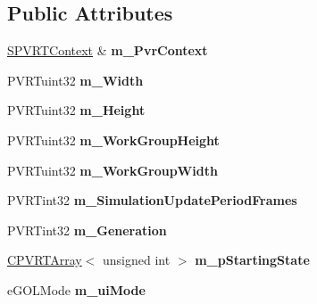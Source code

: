 \subsection*{Public Attributes}
\begin{DoxyCompactItemize}
\item 
\hypertarget{class_game_of_life_af81423a9dd79ec2f2dc280d46642a503}{\hyperlink{struct_s_p_v_r_t_context}{S\+P\+V\+R\+T\+Context} \& {\bfseries m\+\_\+\+Pvr\+Context}}\label{class_game_of_life_af81423a9dd79ec2f2dc280d46642a503}

\item 
\hypertarget{class_game_of_life_a3840077d5d30c9eba60ed7b21aeba0c9}{P\+V\+R\+Tuint32 {\bfseries m\+\_\+\+Width}}\label{class_game_of_life_a3840077d5d30c9eba60ed7b21aeba0c9}

\item 
\hypertarget{class_game_of_life_ad0f876f73910c5c841fe87a4b9963232}{P\+V\+R\+Tuint32 {\bfseries m\+\_\+\+Height}}\label{class_game_of_life_ad0f876f73910c5c841fe87a4b9963232}

\item 
\hypertarget{class_game_of_life_abf9c75cf978b5b17293803a5ff7232b0}{P\+V\+R\+Tuint32 {\bfseries m\+\_\+\+Work\+Group\+Height}}\label{class_game_of_life_abf9c75cf978b5b17293803a5ff7232b0}

\item 
\hypertarget{class_game_of_life_a8ec9259b1e8d9805ff1abb477db73a61}{P\+V\+R\+Tuint32 {\bfseries m\+\_\+\+Work\+Group\+Width}}\label{class_game_of_life_a8ec9259b1e8d9805ff1abb477db73a61}

\item 
\hypertarget{class_game_of_life_a8f4e8a6bd159b7f7db0085e3f55b00cc}{P\+V\+R\+Tint32 {\bfseries m\+\_\+\+Simulation\+Update\+Period\+Frames}}\label{class_game_of_life_a8f4e8a6bd159b7f7db0085e3f55b00cc}

\item 
\hypertarget{class_game_of_life_a8c16f5b6946a84bf9261680acaf4cc83}{P\+V\+R\+Tint32 {\bfseries m\+\_\+\+Generation}}\label{class_game_of_life_a8c16f5b6946a84bf9261680acaf4cc83}

\item 
\hypertarget{class_game_of_life_acb859392e58caac6cfcd2dc9b8df1a02}{\hyperlink{class_c_p_v_r_t_array}{C\+P\+V\+R\+T\+Array}$<$ unsigned int $>$ {\bfseries m\+\_\+p\+Starting\+State}}\label{class_game_of_life_acb859392e58caac6cfcd2dc9b8df1a02}

\item 
\hypertarget{class_game_of_life_aa40d0e0662fa68d15fba1d98ac201a30}{e\+G\+O\+L\+Mode {\bfseries m\+\_\+ui\+Mode}}\label{class_game_of_life_aa40d0e0662fa68d15fba1d98ac201a30}


\end{DoxyCompactItemize}
